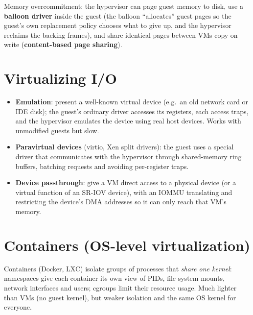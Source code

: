 Memory overcommitment: the hypervisor can page guest memory to disk, use a \textbf{balloon
driver} inside the guest (the balloon ``allocates'' guest pages so the guest's own replacement
policy chooses what to give up, and the hypervisor reclaims the backing frames), and share
identical pages between VMs copy-on-write (\textbf{content-based page sharing}).

\section{Virtualizing I/O}

\begin{itemize}
  \item \textbf{Emulation}: present a well-known virtual device (e.g.\ an old network card or IDE
    disk); the guest's ordinary driver accesses its registers, each access traps, and the
    hypervisor emulates the device using real host devices. Works with unmodified guests but slow.
  \item \textbf{Paravirtual devices} (virtio, Xen split drivers): the guest uses a special driver
    that communicates with the hypervisor through shared-memory ring buffers, batching requests
    and avoiding per-register traps.
  \item \textbf{Device passthrough}: give a VM direct access to a physical device (or a virtual
    function of an SR-IOV device), with an IOMMU translating and restricting the device's DMA
    addresses so it can only reach that VM's memory.
\end{itemize}

\section{Containers (OS-level virtualization)}
Containers (Docker, LXC) isolate groups of processes that \emph{share one kernel}: namespaces give
each container its own view of PIDs, file system mounts, network interfaces and users; cgroups
limit their resource usage. Much lighter than VMs (no guest kernel), but weaker isolation and the
same OS kernel for everyone.

